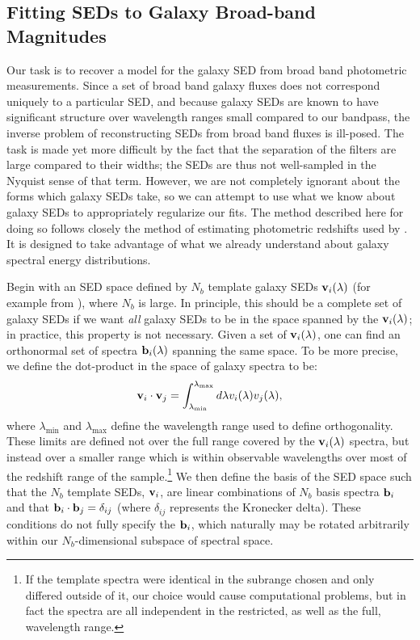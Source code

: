 \documentclass[10pt,preprint]{aastex}
\newcommand{\vv}[1]{{\bf #1}}
\begin{document}
\subsection{Fitting SEDs to Galaxy Broad-band Magnitudes}

Our task is to recover a model for the galaxy SED from broad band
photometric measurements. Since a set of broad band galaxy fluxes does
not correspond uniquely to a particular SED, and because galaxy SEDs
are known to have significant structure over wavelength ranges small
compared to our bandpass, the inverse problem of reconstructing SEDs
from broad band fluxes is ill-posed. The task is made yet more
difficult by the fact that the separation of the filters are large
compared to their widths; the SEDs are thus not well-sampled in the
Nyquist sense of that term. However, we are not completely ignorant
about the forms which galaxy SEDs take, so we can attempt to use what
we know about galaxy SEDs to appropriately regularize our fits.  The
method described here for doing so follows closely the method of
estimating photometric redshifts used by \citet{csabai00a}.  It is
designed to take advantage of what we already understand about galaxy
spectral energy distributions.

Begin with an SED space defined by $N_b$ template galaxy SEDs
$\vv{v}_i(\lambda)$ (for example from \citealt{bruzual93a}), where $N_b$ is
large. In principle, this should be a complete set of galaxy SEDs if
we want {\it all} galaxy SEDs to be in the space spanned by the
$\vv{v}_i(\lambda)$; in practice, this property is not necessary.
Given a set of $\vv{v}_i(\lambda)$, one can find an orthonormal set of
spectra $\vv{b}_i(\lambda)$ spanning the same space.  To be more
precise, we define the dot-product in the space of galaxy spectra to
be:
\begin{equation}
\vv{v}_i \cdot \vv{v}_j =
\int_{\lambda_{\mathrm{min}}}^{\lambda_{\mathrm{max}}} d\lambda
v_i(\lambda) v_j(\lambda),
\end{equation}
where $\lambda_{\mathrm{min}}$ and $\lambda_{\mathrm{max}}$ define the
wavelength range used to define orthogonality. These limits are
defined not over the full range covered by the $\vv{v}_i(\lambda)$
spectra, but instead over a smaller range which is within observable
wavelengths over most of the redshift range of the sample.\footnote{
If the template spectra were identical in the subrange chosen and only
differed outside of it, our choice would cause computational problems,
but in fact the spectra are all independent in the restricted, as well
as the full, wavelength range.}  We then define the basis of the SED
space such that the $N_b$ template SEDs, $\vv{v}_i$, are linear
combinations of $N_b$ basis spectra $\vv{b}_i$ and that $\vv{b}_i
\cdot \vv{b}_j = \delta_{ij}$ (where $\delta_{ij}$ represents the
Kronecker delta). These conditions do not fully specify the
$\vv{b}_i$, which naturally may be rotated arbitrarily within our
$N_b$-dimensional subspace of spectral space.
\end{document}
